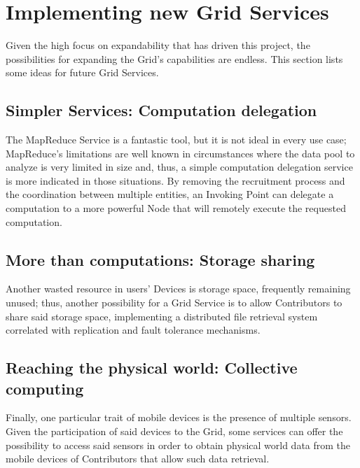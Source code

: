 \section{Implementing new Grid Services}
Given the high focus on expandability that has driven this project, the possibilities for expanding the Grid's capabilities are endless. This section lists some ideas for future Grid Services.

\subsection{Simpler Services: Computation delegation}
The MapReduce Service is a fantastic tool, but it is not ideal in every use case; MapReduce's limitations are well known in circumstances where the data pool to analyze is very limited in size and, thus, a simple computation delegation service is more indicated in those situations. By removing the recruitment process and the coordination between multiple entities, an Invoking Point can delegate a computation to a more powerful Node that will remotely execute the requested computation.

\subsection{More than computations: Storage sharing}
Another wasted resource in users' Devices is storage space, frequently remaining unused; thus, another possibility for a Grid Service is to allow Contributors to share said storage space, implementing a distributed file retrieval system correlated with replication and fault tolerance mechanisms.

\subsection{Reaching the physical world: Collective computing}
Finally, one particular trait of mobile devices is the presence of multiple sensors. Given the participation of said devices to the Grid, some services can offer the possibility to access said sensors in order to obtain physical world data from the mobile devices of Contributors that allow such data retrieval. 